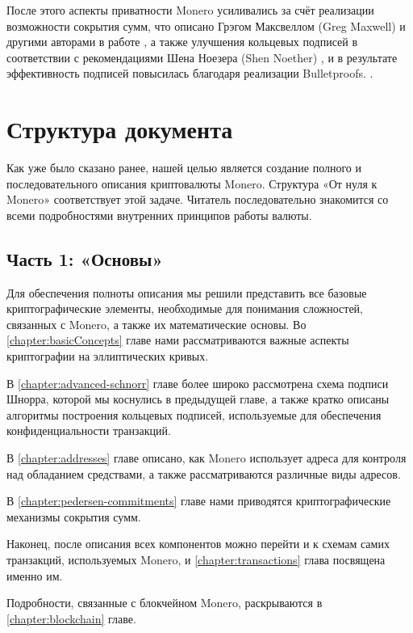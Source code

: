 После этого аспекты приватности Monero усиливались за счёт реализации возможности сокры\-тия сумм, что описано Грэгом Максвеллом (Greg Maxwell) и другими авторами в работе \cite{Signatures2015BorromeanRS}, а также улучшения кольцевых подписей в соответствии с рекомендациями Шена Ноезера (Shen Noether) \cite{MRL-0005-ringct}, и в результате эффективность подписей повысилась благодаря реализации Bulletproofs. \cite{Bulletproofs_paper}.



\section{Структура документа}

Как уже было сказано ранее, нашей целью является создание полного и последовательного описания криптовалюты Monero. Структура «От нуля к Monero» соответствует этой задаче. Читатель последовательно знакомится со всеми подробностями внутренних принципов работы валюты.


\subsection{Часть 1: «Основы»}

Для обеспечения полноты описания мы решили представить все базовые криптографические элементы, необходимые для понимания сложностей, связанных с Monero, а также их \linebreak математические основы. Во \ref{chapter:basicConcepts} главе нами рассматриваются важные аспекты криптографии на эллиптических кривых.

В \ref{chapter:advanced-schnorr} главе более широко рассмотрена схема подписи Шнорра, которой мы коснулись в предыду\-щей главе, а также кратко описаны алгоритмы построения кольцевых подписей, используемые для обеспечения конфиденциальности транзакций.

В \ref{chapter:addresses} главе описано, как Monero использует адреса для контроля над обладанием средствами, а также рассматриваются различные виды адресов.

В \ref{chapter:pedersen-commitments} главе нами приводятся криптографические механизмы сокрытия сумм.

Наконец, после описания всех компонентов можно перейти и к схемам самих транзакций, используемых Monero, и \ref{chapter:transactions} глава посвящена именно им.

Подробности, связанные с блокчейном Monero, раскрываются в \ref{chapter:blockchain} главе.


